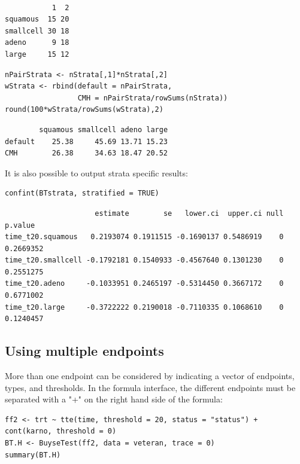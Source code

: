 \documentclass[12pt]{article}
\begin{document}
\begin{verbatim}

           1  2
squamous  15 20
smallcell 30 18
adeno      9 18
large     15 12
\end{verbatim}


\lstset{language=r,label= ,caption= ,captionpos=b,numbers=none}
\begin{lstlisting}
nPairStrata <- nStrata[,1]*nStrata[,2]
wStrata <- rbind(default = nPairStrata,
                 CMH = nPairStrata/rowSums(nStrata)) 
round(100*wStrata/rowSums(wStrata),2)
\end{lstlisting}

\begin{verbatim}
        squamous smallcell adeno large
default    25.38     45.69 13.71 15.23
CMH        26.38     34.63 18.47 20.52
\end{verbatim}


It is also possible to output strata specific results:
\lstset{language=r,label= ,caption= ,captionpos=b,numbers=none}
\begin{lstlisting}
confint(BTstrata, stratified = TRUE)
\end{lstlisting}

\begin{verbatim}
                     estimate        se   lower.ci  upper.ci null   p.value
time_t20.squamous   0.2193074 0.1911515 -0.1690137 0.5486919    0 0.2669352
time_t20.smallcell -0.1792181 0.1540933 -0.4567640 0.1301230    0 0.2551275
time_t20.adeno     -0.1033951 0.2465197 -0.5314450 0.3667172    0 0.6771002
time_t20.large     -0.3722222 0.2190018 -0.7110335 0.1068610    0 0.1240457
\end{verbatim}


\clearpage


\subsection{Using multiple endpoints}
\label{sec:org3ef3f1c}
More than one endpoint can be considered by indicating a vector of
endpoints, types, and thresholds. In the formula interface, the
different endpoints must be separated with a "+" on the right hand
side of the formula:
\lstset{language=r,label= ,caption= ,captionpos=b,numbers=none}
\begin{lstlisting}
ff2 <- trt ~ tte(time, threshold = 20, status = "status") + cont(karno, threshold = 0)
BT.H <- BuyseTest(ff2, data = veteran, trace = 0)
summary(BT.H)
\end{lstlisting}
\end{document}
